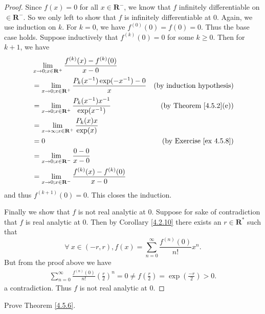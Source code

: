 \begin{proof}
    Since \(f(x) = 0\) for all \(x \in \mathbf{R}^-\), we know that \(f\) infinitely differentiable on \(\in \mathbf{R}^-\).
    So we only left to show that \(f\) is infinitely differentiable at \(0\).
    Again, we use induction on \(k\).
    For \(k = 0\), we have \(f^{(0)}(0) = f(0) = 0\).
    Thus the base case holds.
    Suppose inductively that \(f^{(k)}(0) = 0\) for some \(k \geq 0\).
    Then for \(k + 1\), we have
    \begin{align*}
         & \lim_{x \to 0 ; x \in \mathbf{R}^+} \frac{f^{(k)}(x) - f^{(k)}(0)}{x - 0}                                           \\
         & = \lim_{x \to 0 ; x \in \mathbf{R}^+} \frac{P_k(x^{-1}) \exp(-x^{-1}) - 0}{x} & \text{(by induction hypothesis)}    \\
         & = \lim_{x \to 0 ; x \in \mathbf{R}^+} \frac{P_k(x^{-1}) x^{-1}}{\exp(x^{-1})} & \text{(by Theorem \ref{4.5.2}(e))}  \\
         & = \lim_{x \to \infty ; x \in \mathbf{R}^+} \frac{P_k(x) x}{\exp(x)}                                                 \\
         & = 0                                                                           & \text{(by Exercise \ref{ex 4.5.8})} \\
         & = \lim_{x \to 0 ; x \in \mathbf{R}^-} \frac{0 - 0}{x - 0}                                                           \\
         & = \lim_{x \to 0 ; x \in \mathbf{R}^-} \frac{f^{(k)}(x) - f^{(k)}(0)}{x - 0}
    \end{align*}
    and thus \(f^{(k + 1)}(0) = 0\).
    This closes the induction.

    Finally we show that \(f\) is not real analytic at \(0\).
    Suppose for sake of contradiction that \(f\) is real analytic at \(0\).
    Then by Corollary \ref{4.2.10} there exists an \(r \in \mathbf{R}^*\) such that
    \[
        \forall\ x \in (-r, r), f(x) = \sum_{n = 0}^\infty \frac{f^{(n)}(0)}{n!} x^n.
    \]
    But from the proof above we have
    \begin{align*}
        \sum_{n = 0}^\infty \frac{f^{(n)}(0)}{n!} (\frac{r}{2})^n = 0 \neq f(\frac{r}{2}) = \exp(\frac{-r}{2}) > 0.
    \end{align*}
    a contradiction.
    Thus \(f\) is not real analytic at \(0\).
\end{proof}

\begin{exercise}\label{ex 4.5.5}
    Prove Theorem \ref{4.5.6}.
\end{exercise}

